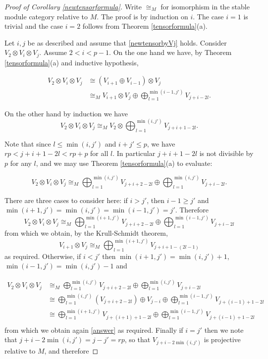 \documentclass[a4paper]{amsart}
\theoremstyle{definition}
\theoremstyle{remark}
\theoremstyle{Acknowledgments}
\begin{document}
\begin{proof}[Proof of Corollary \ref{newtensorformula}] Write $\cong_M$ for isomorphism in the stable module category relative to $M$. The proof is by induction on $i$. The case $i=1$ is trivial and the case $i=2$ follows from Theorem \ref{tensorformula}(a). 

Let $i,j$ be as described and assume that \eqref{newtensorbyVj} holds. Consider $V_2 \otimes V_i \otimes V_j$. Assume $2<i<p-1$. On the one hand we have, by  Theorem \ref{tensorformula}(a) and inductive hypothesis,

\begin{align*}
V_2 \otimes V_i \otimes V_j &\cong (V_{i+1} \oplus V_{i-1}) \otimes V_j\\
&\cong_M V_{i+1} \otimes V_j \oplus  \bigoplus_{l=1}^{\min(i-1,j')} V_{j+i-2l}.
\end{align*}

On the other hand by induction we have
\[
V_2 \otimes V_i \otimes V_j  \cong_M V_2 \otimes  \bigoplus_{l=1}^{\min(i,j')} V_{j+i+1-2l}.\]

Note that since $l \leq \min(i,j')$ and $i+j' \leq p$, we have $rp<j+i+1-2l<rp+p$ for all $l$. In particular $j+i+1-2l$ is not divisible by $p$ for any $l$, and we may use Theorem \ref{tensorformula}(a) to evaluate:

\[ V_2 \otimes V_i \otimes V_j  \cong_M     \bigoplus_{l=1}^{\min(i,j')} V_{j+i+2-2l} \oplus \bigoplus_{l=1}^{\min(i,j')} V_{j+i-2l}.\]

There are three cases to consider here: if $i>j'$, then $i-1 \geq j'$ and $\min(i+1,j') = \min(i,j') = \min(i-1,j') = j'$. Therefore
\[ V_2 \otimes V_i \otimes V_j  \cong_M \bigoplus_{l=1}^{\min(i+1,j')} V_{j+i+2-2l} \oplus \bigoplus_{l=1}^{\min(i-1,j')} V_{j+i-2l}\]
from which we obtain, by the Krull-Schmidt theorem, \begin{equation}\label{answer} V_{i+1} \otimes V_j \cong_M \bigoplus_{l=1}^{\min(i+1,j')} V_{j+i+1-(2l-1)}\end{equation} as required.
Otherwise, if $i < j'$ then $\min(i+1,j') = \min(i,j')+1$, $\min(i-1,j')=\min(i,j')-1$ and

\begin{align*}
 V_2 \otimes V_i \otimes V_j  &\cong_M \bigoplus_{l=1}^{\min(i,j')} V_{j+i+2-2l} \oplus \bigoplus_{l=1}^{\min(i,j')} V_{j+i-2l}\\
&\cong \bigoplus_{l=1}^{\min(i,j')} (V_{j+i+2-2l}) \oplus V_{j-i} \oplus \bigoplus_{l=1}^{\min(i-1,j')} V_{j+(i-1)+1-2l}\\
&\cong \bigoplus_{l=1}^{\min(i+1,j')} V_{j+(i+1)+1-2l} \oplus \bigoplus_{l=1}^{\min(i-1,j')} V_{j+(i-1)+1-2l} \\
\end{align*}
from which we obtain again \eqref{answer} as required. Finally if $i=j'$ then we note that $j+i-2\min(i,j') = j-j' = rp$, so that $V_{j+i-2\min(i,j')}$ is projective relative to $M$, and therefore 


\end{proof}
\end{document}
